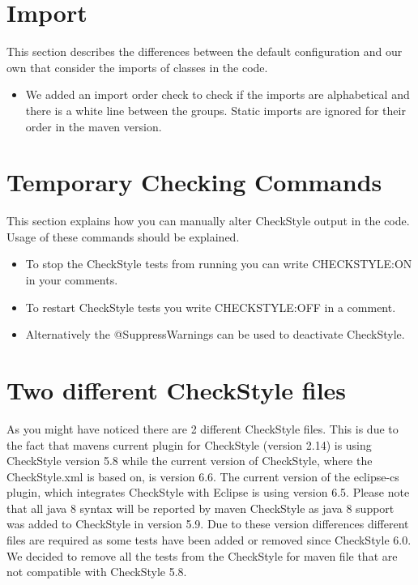 \documentclass[11pt,a4paper]{report}
\begin{document}
\section{Import}

This section describes the differences between the default configuration and our own that consider the imports of classes in the code. 

\begin{itemize}

\item We added an import order check to check if the imports are alphabetical and there is a white line between the groups. Static imports are ignored for their order in the maven version.

\end{itemize}

\section{Temporary Checking Commands}

This section explains how you can manually alter CheckStyle output in the code. Usage of these commands should be explained.

\begin{itemize}

\item To stop the CheckStyle tests from running you can write CHECKSTYLE:ON in your comments.

\item To restart CheckStyle tests you write CHECKSTYLE:OFF in a comment.

\item Alternatively the @SuppressWarnings can be used to deactivate CheckStyle.

\end{itemize}

\section{Two different CheckStyle files}

As you might have noticed there are 2 different CheckStyle files. This is due to the fact that mavens current plugin for CheckStyle (version 2.14) is using CheckStyle version 5.8 while the current version of CheckStyle, where the CheckStyle.xml is based on, is version 6.6. The current version of the eclipse-cs plugin, which integrates CheckStyle with Eclipse is using version 6.5. Please note that all java 8 syntax will be reported by maven CheckStyle as java 8 support was added to CheckStyle in version 5.9. Due to these version differences different files are required as some tests have been added or removed since CheckStyle 6.0. We decided to remove all the tests from the CheckStyle for maven file that are not compatible with CheckStyle 5.8.
\end{document}
